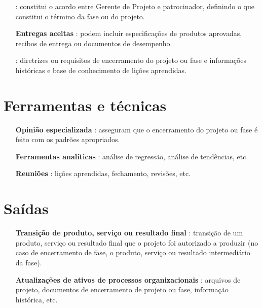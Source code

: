 \begin{itemize}
	
	\item[\textbf{\planproj}]: constitui o acordo entre Gerente de Projeto e patrocinador, definindo o que constitui o término da fase ou do projeto.
	
	\item[\textbf{Entregas aceitas}]: podem incluir especificações de produtos aprovadas, recibos de entrega ou documentos de desempenho.
	
	\item[\textbf{\ativ}]: diretrizes ou requisitos de encerramento do projeto ou fase e informações históricas e base de conhecimento de lições aprendidas.
	
\end{itemize}

\section{Ferramentas e técnicas}

\begin{itemize}
	
	\item[\textbf{Opinião especializada}]: asseguram que o encerramento do projeto ou fase é feito com os padrões apropriados.
	
	\item[\textbf{Ferramentas analíticas}]: análise de regressão, análise de tendências, etc.

	\item[\textbf{Reuniões}]: lições aprendidas, fechamento, revisões, etc.
	

\end{itemize}

\section{Saídas}

\begin{itemize}
		
	\item[\textbf{Transição de produto, serviço ou resultado final}] : transição de um produto, serviço ou resultado final que o projeto foi autorizado a produzir (no caso de encerramento de fase, o produto, serviço ou resultado intermediário da fase).
	
	\item[\textbf{Atualizações de ativos de processos organizacionais}] : arquivos de projeto, documentos de encerramento de projeto ou fase, informação histórica, etc.
	
\end{itemize}

